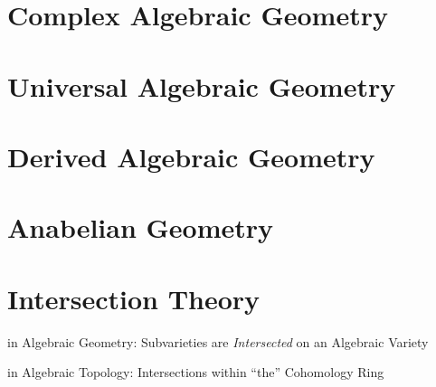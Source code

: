 \section{Complex Algebraic Geometry}
\label{sec:complex_algebraic_geometry}

\section{Universal Algebraic Geometry}\label{sec:universal_geometry}

\section{Derived Algebraic Geometry}
\label{sec:derived_algebraic_geometry}

\section{Anabelian Geometry}\label{sec:anabelian_geometry}

\section{Intersection Theory}\label{sec:intersection_theory}

in Algebraic Geometry: Subvarieties are \emph{Intersected} on an
Algebraic Variety

in Algebraic Topology: Intersections within ``the'' Cohomology Ring
